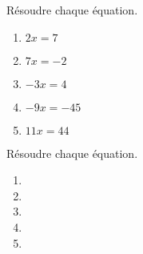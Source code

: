 \begin{exercice*}
    Résoudre chaque équation.
    \begin{multicols}{2}
        \begin{enumerate}
            \item $2x=7$
            \item $7x=-2$
            \item $-3x=4$
            \item $-9x=-45$
            \item $11x=44$
        \end{enumerate}
    \end{multicols}
\end{exercice*}
\begin{corrige}
    Résoudre chaque équation.
    \begin{multicols}{2}
        \begin{enumerate}
            \item {}
            \item {}
            \item {}
            \item {}
            \item {}
        \end{enumerate}
    \end{multicols}    
\end{corrige}

